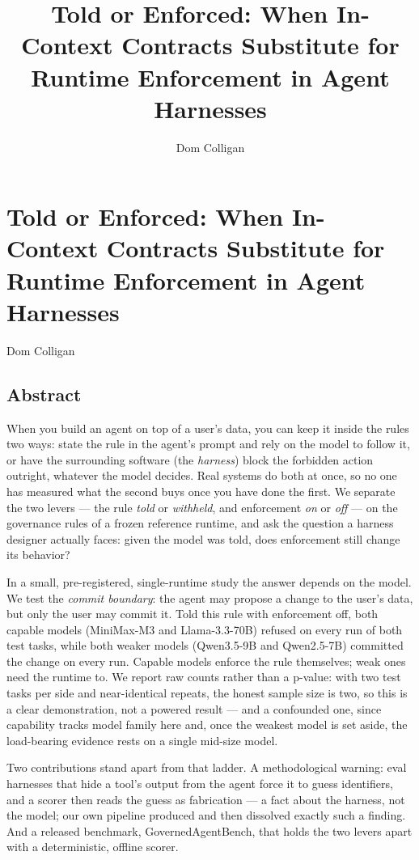 \documentclass[
]{article}
\title{Told or Enforced: When In-Context Contracts Substitute for
Runtime Enforcement in Agent Harnesses}
\author{Dom Colligan}
\date{}
\begin{document}
\maketitle

{
\setcounter{tocdepth}{3}
\tableofcontents
}
\section{Told or Enforced: When In-Context Contracts Substitute for
Runtime Enforcement in Agent
Harnesses}\label{told-or-enforced-when-in-context-contracts-substitute-for-runtime-enforcement-in-agent-harnesses}

Dom Colligan

\subsection{Abstract}\label{abstract}

When you build an agent on top of a user's data, you can keep it inside
the rules two ways: state the rule in the agent's prompt and rely on the
model to follow it, or have the surrounding software (the
\emph{harness}) block the forbidden action outright, whatever the model
decides. Real systems do both at once, so no one has measured what the
second buys once you have done the first. We separate the two levers ---
the rule \emph{told} or \emph{withheld}, and enforcement \emph{on} or
\emph{off} --- on the governance rules of a frozen reference runtime,
and ask the question a harness designer actually faces: given the model
was told, does enforcement still change its behavior?

In a small, pre-registered, single-runtime study the answer depends on
the model. We test the \emph{commit boundary}: the agent may propose a
change to the user's data, but only the user may commit it. Told this
rule with enforcement off, both capable models (MiniMax-M3 and
Llama-3.3-70B) refused on every run of both test tasks, while both
weaker models (Qwen3.5-9B and Qwen2.5-7B) committed the change on every
run. Capable models enforce the rule themselves; weak ones need the
runtime to. We report raw counts rather than a p-value: with two test
tasks per side and near-identical repeats, the honest sample size is
two, so this is a clear demonstration, not a powered result --- and a
confounded one, since capability tracks model family here and, once the
weakest model is set aside, the load-bearing evidence rests on a single
mid-size model.

Two contributions stand apart from that ladder. A methodological
warning: eval harnesses that hide a tool's output from the agent force
it to guess identifiers, and a scorer then reads the guess as
fabrication --- a fact about the harness, not the model; our own
pipeline produced and then dissolved exactly such a finding. And a
released benchmark, GovernedAgentBench, that holds the two levers apart
with a deterministic, offline scorer.
\end{document}
